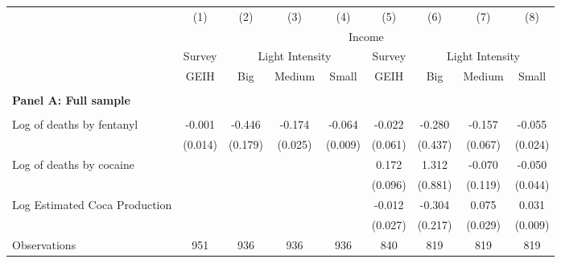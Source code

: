 \begin{tabular}{lcccccccc} \\ \hline 
                    &\multicolumn{1}{c}{(1)}         &\multicolumn{1}{c}{(2)}         &\multicolumn{1}{c}{(3)}         &\multicolumn{1}{c}{(4)}         &\multicolumn{1}{c}{(5)}         &\multicolumn{1}{c}{(6)}         &\multicolumn{1}{c}{(7)}         &\multicolumn{1}{c}{(8)}         \\
 & \multicolumn{8}{c}{Income} \\ \cline{2-5} \cline{6-9}   & Survey  &  \multicolumn{3}{c}{Light Intensity} & Survey & \multicolumn{3}{c}{Light Intensity} \\ \cline{3-5} \cline{7-9} & GEIH & Big & Medium & Small & GEIH & Big & Medium & Small \\ \hline  & & & & &  &  &  &  \\ \textbf{Panel A: Full sample} \\ & & & & & & & & \\
Log of deaths by fentanyl&      -0.001         &      -0.446\sym{**} &      -0.174\sym{***}&      -0.064\sym{***}&      -0.022         &      -0.280         &      -0.157\sym{*}  &      -0.055\sym{*}  \\
                    &     (0.014)         &     (0.179)         &     (0.025)         &     (0.009)         &     (0.061)         &     (0.437)         &     (0.067)         &     (0.024)         \\
\addlinespace
Log of deaths by cocaine&                     &                     &                     &                     &       0.172         &       1.312         &      -0.070         &      -0.050         \\
                    &                     &                     &                     &                     &     (0.096)         &     (0.881)         &     (0.119)         &     (0.044)         \\
\addlinespace
Log Estimated Coca Production&                     &                     &                     &                     &      -0.012         &      -0.304         &       0.075\sym{**} &       0.031\sym{**} \\
                    &                     &                     &                     &                     &     (0.027)         &     (0.217)         &     (0.029)         &     (0.009)         \\
\arrayrulecolor{black!10}\midrule
Observations        &         951         &         936         &         936         &         936         &         840         &         819         &         819         &         819         \\

\end{tabular}
